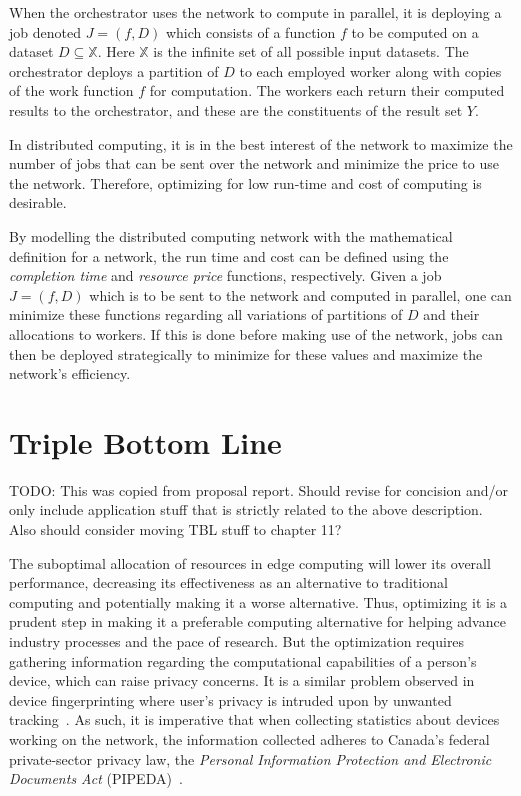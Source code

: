 \documentclass[../mthe-493-final-project.tex]{subfiles}
\begin{document}
    When the orchestrator uses the network to compute in parallel, it is deploying a job denoted $J = (f,D)$ which consists of a function $f$ to be computed on a dataset $D \subseteq \mathbb{X}$. Here $\mathbb{X}$ is the infinite set of all possible input datasets. The orchestrator deploys a partition of $D$ to each employed worker along with copies of the work function $f$ for computation. The workers each return their computed results to the orchestrator, and these are the constituents of the result set $Y$.

    In distributed computing, it is in the best interest of the network to maximize the number of jobs that can be sent over the network and minimize the price to use the network. Therefore, optimizing for low run-time and cost of computing is desirable.

    By modelling the distributed computing network with the mathematical definition for a network, the run time and cost can be defined using the \textit{completion time} and \textit{resource price} functions, respectively. Given a job $J = (f,D)$ which is to be sent to the network and computed in parallel, one can minimize these functions regarding all variations of partitions of $D$ and their allocations to workers. If this is done before making use of the network, jobs can then be deployed strategically to minimize for these values and maximize the network's efficiency.

    \section{Triple Bottom Line}
    
    TODO: This was copied from proposal report. Should revise for concision and/or only include application stuff that is strictly related to the above description. Also should consider moving TBL stuff to chapter 11?
    
    
    The suboptimal allocation of resources in edge computing will lower its overall performance, decreasing its effectiveness as an alternative to traditional computing and potentially making it a worse alternative. Thus, optimizing it is a prudent step in making it a preferable computing alternative for helping advance industry processes and the pace of research. But the optimization requires gathering information regarding the computational capabilities of a person's device, which can raise privacy concerns. It is a similar problem observed in device fingerprinting where user's privacy is intruded upon by unwanted tracking~\cite{laperdrix_browser_2020}. As such, it is imperative that when collecting statistics about devices working on the network, the information collected adheres to Canada’s federal private-sector privacy law, the \textit{Personal Information Protection and Electronic Documents Act} (PIPEDA)~\cite{noauthor_privacy_nodate}.
\end{document}
